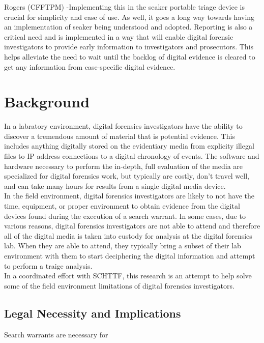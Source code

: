 \documentclass[12pt]{article}
\begin{document}
Rogers (CFFTPM) -Implementing this in the \gls{seaker} portable triage device is crucial for simplicity and ease of use.  As well, it goes a
long way towards having an implementation of \gls{seaker} being understood and adopted.  Reporting is also a critical need
and is implemented in a way that will enable digital forensic investigators to provide early information to
investigators and prosecutors.  This helps alleviate the need to wait until the backlog of digital evidence is cleared
to get any information from case-specific digital evidence.\\


\section{Background}
\label{sect-background}

In a labratory environment, digital forensics investigators have the ability to discover
a tremendous amount of material that is potential evidence.  This includes anything 
digitally stored on the evidentiary media from
explicity illegal files to IP address connections to a digital chronology of
events.\cite{raghavan2013digital}\cite{rogers2006computer}
The software and hardware necessary to perform the
in-depth, full evaluation of the media are specialized for digital forensics 
work, but typically are costly, don't travel well, and can take many hours for
results from a single digital media device.\\

In the field environment, digital forensics
investigators are likely to not have the time, equipment, or proper environment to
obtain evidence from the digital devices found during the execution of a search
warrant.  In some cases, due to various reasons, digital forensics investigators
are not able to attend and therefore all of the digital media is taken into
custody for analysis at the digital forensics lab.  When they are able to attend,
they typically
bring a subset of their lab environment with them to start deciphering
the digital information and attempt to perform a traige analysis.\\

In a coordinated effort with SCHTTF, this research is an attempt to help
solve some of the field environment limitations of digital forensics investigators.


\subsection{Legal Necessity and Implications}
Search warrants are necessary for 
\end{document}
